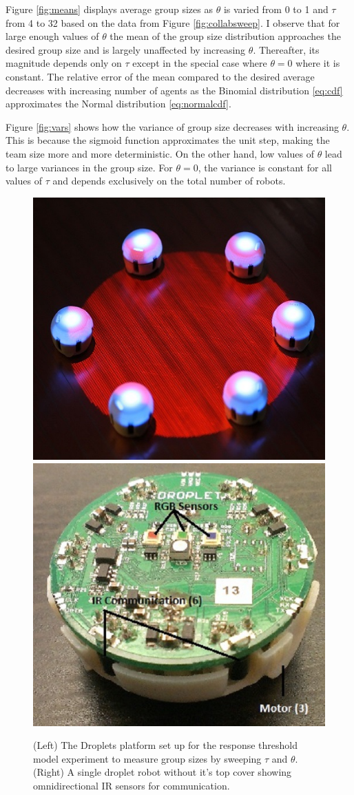 \documentclass[12pt]{book}
\begin{document}
Figure \ref{fig:means} displays average group sizes as $\theta$ is varied from 0 to 1 and $\tau$ from 4 to 32 based on the data from Figure \ref{fig:collabsweep}. I observe that for large enough values of $\theta$ the mean of the group size distribution approaches the desired group size and is largely unaffected by increasing $\theta$. Thereafter, its magnitude depends only on $\tau$ except in the special case where $\theta = 0$ where it is constant. The relative error of the mean compared to the desired average decreases with increasing number of agents as the  Binomial distribution \eqref{eq:cdf}
approximates the Normal distribution \eqref{eq:normalcdf}.

Figure \ref{fig:vars} shows how the variance of group size decreases with increasing $\theta$. This is because the sigmoid function approximates the unit step, making the team size more and more deterministic. On the other hand, low values of $\theta$ lead to large variances in the group size. For $\theta=0$, the variance is constant for all values of $\tau$ and depends exclusively on the total number of robots. 

\begin{figure}[!ht]
\centering\includegraphics[width=.49\textwidth]{../assets/DARSexp.jpg}
\centering\includegraphics[width=.49\textwidth]{../assets/droplettop.jpg}
\centering\caption{(Left) The Droplets platform set up for the response threshold model experiment to measure group sizes by sweeping $\tau$ and $\theta$. (Right) A single droplet robot without it's top cover showing omnidirectional IR sensors for communication.}\label{fig:DARSdropexp}
\end{figure}
\end{document}
